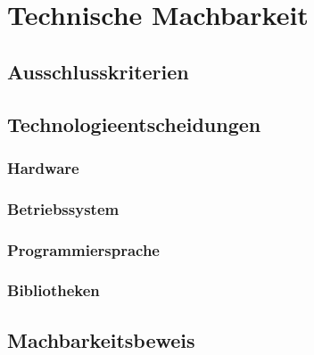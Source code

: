 \chapter{Technische Machbarkeit}\label{ch:technische-machbarkeit}


\section{Ausschlusskriterien}\label{sec:ausschlusskriterien}


\section{Technologieentscheidungen}\label{sec:technologieentscheidungen}

\subsection{Hardware}\label{subsec:hardware}

\subsection{Betriebssystem}\label{subsec:betriebssystem}

\subsection{Programmiersprache}\label{subsec:programmiersprache}

\subsection{Bibliotheken}\label{subsec:bibliotheken}


\section{Machbarkeitsbeweis}\label{sec:machbarkeitsbeweis}